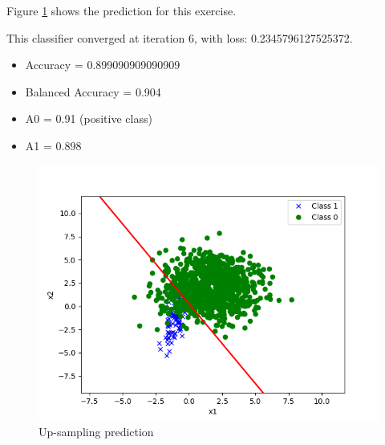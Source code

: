 
\begin{answer}

Figure \ref{fig:upsampling} shows the prediction for this exercise. 

This classifier converged at iteration 6, with loss: 0.2345796127525372.
\begin{itemize}
    \item Accuracy = 0.899090909090909
    \item Balanced Accuracy = 0.904
    \item A0 = 0.91 (positive class)
    \item A1 = 0.898
\end{itemize}

\begin{figure}
    \centering
    \includegraphics[width=0.75\linewidth]{ps1/tex/img/imbalanced_upsampling_pred.png}
    \caption{Up-sampling prediction}
    \label{fig:upsampling}
\end{figure}
\end{answer}